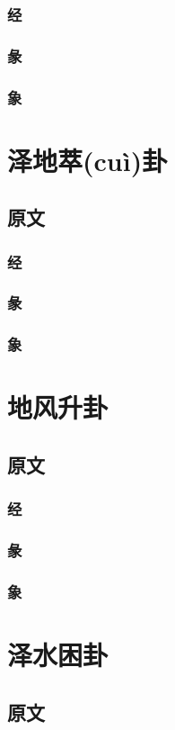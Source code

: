 \documentclass[12pt,oneside]{book}
\begin{document}
\subsection{经}
\subsection{彖}
\subsection{象}

\chapter{泽地萃(cuì)卦}
\section{原文}
\subsection{经}
\subsection{彖}
\subsection{象}

\chapter{地风升卦}
\section{原文}
\subsection{经}
\subsection{彖}
\subsection{象}

\chapter{泽水困卦}
\section{原文}
\end{document}
